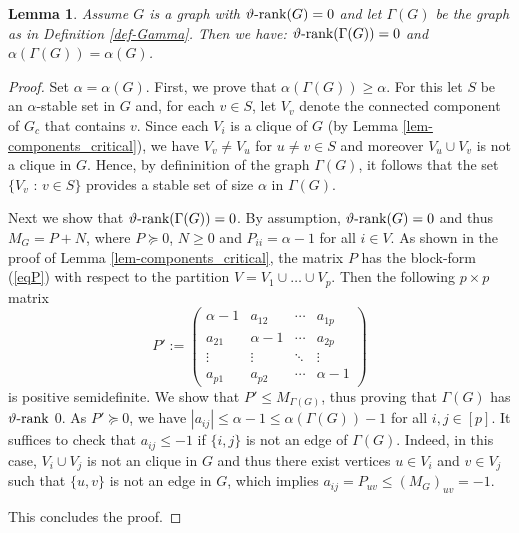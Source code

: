\documentclass[11pt]{article}
\newcommand{\ignore}[1]{}
\newtheorem{lemma}[theorem]{Lemma}
\numberwithin{equation}{section}
\newcommand{\rrank}{\vartheta\text{\rm -rank}}
\begin{document}
\begin{lemma}\label{lem-alpha-gamma}
Assume  $G$ is a graph with $\rrank(G)=0$ and let $\Gamma(G)$ be the graph as in Definition \ref{def-Gamma}.  Then we have:
$\rrank(\Gamma(G))=0$ and $\alpha(\Gamma(G))=\alpha(G)$.
\end{lemma}

\begin{proof}
Set $\alpha=\alpha(G)$. First, we prove that $\alpha(\Gamma(G)) \geq \alpha$. For this let $S$ be an $\alpha$-stable set in $G$ and, for each $v\in S$,  let $V_v$ denote  the connected component of $G_c$ that contains $v$.  Since each $V_i$  is a clique of $G$ (by Lemma \ref{lem-components_critical}), we have $V_v\neq V_u$ for $u\neq v\in S$ and moreover $V_u\cup V_v$ is not a clique in $G$. Hence, by defininition of the graph $\Gamma(G)$, it follows that the set $\{V_v \text{ : } v\in S\}$ provides a stable set of size $\alpha$ in $\Gamma(G)$.

Next we show that  $\rrank(\Gamma(G))=0$.
By assumption,  $\rrank(G)=0$ and thus  $M_G=P+N$, where  $P\succeq 0$, $N\geq 0$ and $P_{ii}=\alpha-1$ for all $i\in V$. As shown in the proof of Lemma   \ref{lem-components_critical}, 
the matrix $P$ has the block-form (\ref{eqP}) with respect to the partition $V=V_1\cup\ldots\cup V_p$.
Then the following $p\times p$  matrix 
$$
P':=\begin{pmatrix}
\alpha -1 & a_{12} & \cdots & a_{1p} \\
a_{21}& \alpha -1& \cdots & a_{2p}\\
\vdots  & \vdots  & \ddots & \vdots  \\
a_{p1}& a_{p2} & \cdots & \alpha-1 
\end{pmatrix}
$$
is positive semidefinite. We show that $P'\leq M_{\Gamma(G)}$, thus proving that $\Gamma(G)$ has $\rrank$ 0. As $P'\succeq 0$, we have $|a_{ij}|\le \alpha -1 \leq \alpha(\Gamma(G))-1$ for all $i,j\in [p]$.  It suffices to check that $a_{ij}\le -1$ if $\{i,j\}$ is not an edge of $\Gamma(G)$. Indeed, in this case,  $V_i\cup V_j$ is not an clique in $G$ and thus  there exist vertices $u\in V_i$ and $v \in V_j$ such that $\{u,v\}$ is not an edge in $G$, which implies  $a_{ij}=P_{uv} \le (M_G)_{uv}=-1$. 
\ignore{Therefore, we have  $P' \leq \alpha(A_{\Gamma(G)}+I)-J \leq \alpha(\Gamma(G))(A_{\Gamma(G)}+I)-J =M_{\Gamma(G)}$, where we use the fact that $\alpha\le \alpha(\Gamma(G))$.}
 This concludes the proof.


\end{proof}
\end{document}

